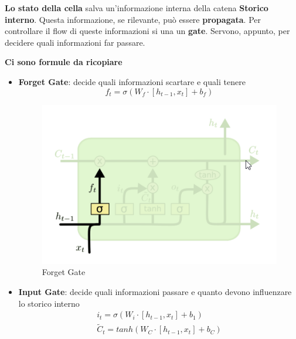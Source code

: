 \textbf{Lo stato della cella} salva un'informazione interna della catena \textbf{Storico interno}. Questa informazione,
se rilevante, può essere \textbf{propagata}. Per controllare il flow di queste informazioni si una un \textbf{gate}. Servono, appunto,
per decidere quali informazioni far passare.

\textbf{Ci sono formule da ricopiare}
\begin{itemize}
    \item \textbf{Forget Gate}: decide quali informazioni scartare e quali tenere
          \[
              f_t = \sigma(W_f \cdot[h_{t-1}, x_t] + b_f)\]
          \begin{figure}[H]
              \begin{center}
                  \includegraphics[scale=0.8]{images/forgetgate.png}
              \end{center}
              \caption{Forget Gate}
          \end{figure}
    \item \textbf{Input Gate}: decide quali informazioni passare e quanto devono influenzare lo storico interno
          \begin{equation}
              \begin{aligned}
                  i_t = \sigma(W_i \cdot [h_{t-1}, x_t] + b_1)       \\
                  \tilde{C}_t = tanh(W_C \cdot [h_{t-1}, x_t] + b_C) \\
              \end{aligned}
          \end{equation}
          \begin{figure}[H]
              \begin{center}

\end{center}
\end{figure}
\end{itemize}
